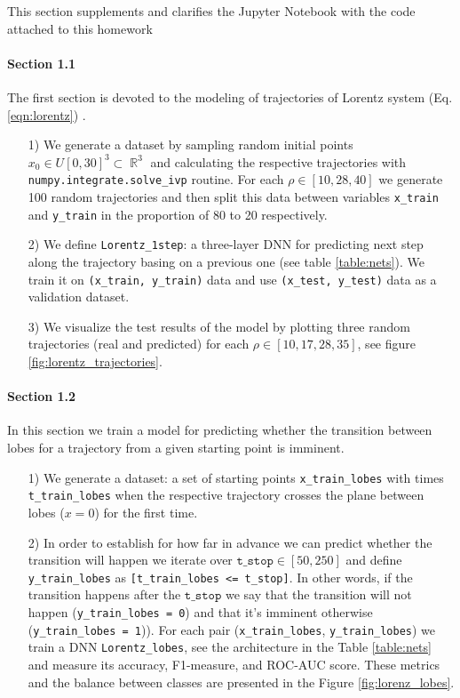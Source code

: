 \documentclass{article}
\DeclareMathOperator{\R}{\mathbb{R}}
\begin{document}
This section supplements and clarifies the Jupyter Notebook with the code attached to this homework 

 
\paragraph{Section 1.1} The first section is devoted to the modeling of trajectories of Lorentz system (Eq. \ref{eqn:lorentz}) . 
    \begin{enumerate}
    \item[1)] We generate a dataset by sampling random initial points $x_0 \in U[0,30]^3 \subset \R^3$ and calculating the respective trajectories with \texttt{numpy.integrate.solve\_ivp} routine. For each $\rho \in [10, 28, 40]$ we generate 100 random trajectories and then split this data between variables \texttt{x\_train} and \texttt{y\_train} in the proportion of 80 to 20 respectively. 
    \item[2)] We define \texttt{Lorentz\_1step}: a three-layer DNN for predicting next step along the trajectory basing on a previous one (see table \ref{table:nets}). We train it on \texttt{(x\_train, y\_train)} data and use \texttt{(x\_test, y\_test)} data as a validation dataset. 
    \item[3)] We visualize the test results of the model by plotting three random trajectories (real and predicted) for each $\rho \in [10, 17, 28, 35]$, see figure \ref{fig:lorentz_trajectories}. 
    \end{enumerate}
\paragraph{Section 1.2} In this section we train a model for predicting whether the transition between lobes for a trajectory from a given starting point is imminent. 
    \begin{enumerate}
        \item[1)] We generate a dataset: a set of starting points \texttt{x\_train\_lobes} with times \texttt{t\_train\_lobes} when the respective trajectory crosses the plane between lobes ($x = 0$) for the first time. 
        \item[2)] In order to establish for how far in advance we can predict whether the transition will happen we iterate over $\texttt{t\_stop} \in [50, 250]$ and define \texttt{y\_train\_lobes} as \texttt{[t\_train\_lobes <= t\_stop]}. In other words, if the transition happens after the $\texttt{t\_stop}$ we say that the transition will not happen (\texttt{y\_train\_lobes = 0}) and that it's imminent otherwise (\texttt{y\_train\_lobes = 1})). For each pair (\texttt{x\_train\_lobes}, \texttt{y\_train\_lobes}) we train a DNN \texttt{Lorentz\_lobes}, see the architecture in the Table \ref{table:nets} and measure its accuracy, F1-measure, and ROC-AUC score. These metrics and the balance between classes are presented in the Figure \ref{fig:lorenz_lobes}. 
    \end{enumerate}
\end{document}
